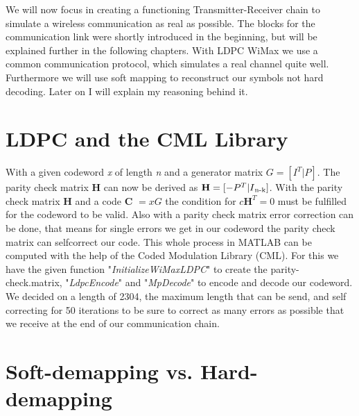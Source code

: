 \documentclass[12pt,oneside, draft]{report}
\begin{document}
We will now focus in creating a functioning Transmitter-Receiver chain to simulate a wireless communication as real as possible. The blocks for the communication link were shortly introduced in the beginning, but will be explained further in the following chapters. With LDPC WiMax we use a common communication protocol, which simulates a real channel quite well. Furthermore we will use soft mapping to reconstruct our symbols not hard decoding. Later on I will explain my reasoning behind it.  

\section{LDPC and the CML Library}
With a given codeword \textit{x} of length \textit{n} and a generator matrix $G = [I^T|P]$. The parity check matrix \textbf{H} can now be derived as $\textbf{H} = [-P^T|I\textsubscript{n-k}]$. With the parity check matrix \textbf{H} and a code \textbf{C} $= xG$ the condition for $c\textbf{H}^T = 0$ must be fulfilled for the codeword to be valid. 
\newline 
Also with a parity check matrix error correction can be done, that means for single errors we get in our codeword the parity check matrix can selfcorrect our code.
This whole process in MATLAB can be computed with the help of the Coded Modulation Library (CML). For this we have the given function "\textit{InitializeWiMaxLDPC}" to create the parity-check.matrix, "\textit{LdpcEncode}" and "\textit{MpDecode}" to encode and decode our codeword.
We decided on a length of 2304, the maximum length that can be send, and self correcting for 50 iterations to be sure to correct as many errors as possible that we receive at the end of our communication chain.

\section{Soft-demapping vs. Hard-demapping}
\end{document}
